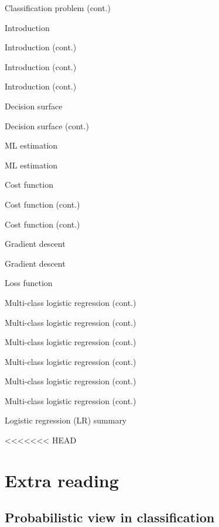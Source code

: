 \documentclass[serif, aspectratio=169]{beamer}
\begin{document}
\begin{frame}{Classification problem (cont.)}
\begin{itemize}
\begin{frame}{Introduction}
\begin{itemize}
\begin{frame}{Introduction (cont.)}
\begin{frame}{Introduction (cont.)}
\begin{frame}{Introduction (cont.)}
\begin{frame}{Decision surface}
\begin{itemize}
\begin{frame}{Decision surface (cont.)}
\begin{frame}{ML estimation}
\begin{frame}{ML estimation}
\begin{itemize}
\begin{frame}{Cost function}
\begin{frame}{Cost function (cont.)}
\begin{itemize}
\begin{itemize}
\begin{frame}{Cost function (cont.)}
\begin{frame}{Gradient descent}
\begin{frame}{Gradient descent}
\begin{frame}{Loss function}
\begin{frame}{Multi-class logistic regression (cont.)}
\begin{frame}{Multi-class logistic regression (cont.)}
\begin{frame}{Multi-class logistic regression (cont.)}
\begin{frame}{Multi-class logistic regression (cont.)}
\begin{frame}{Multi-class logistic regression (cont.)}
\begin{frame}{Multi-class logistic regression (cont.)}
\begin{frame}{Logistic regression (LR) summary}
\begin{itemize}
<<<<<<< HEAD
\section{Extra reading}
\subsection{Probabilistic view in classification}


\end{itemize}
\end{frame}
\end{frame}
\end{frame}
\end{frame}
\end{frame}
\end{frame}
\end{frame}
\end{frame}
\end{frame}
\end{frame}
\end{frame}
\end{itemize}
\end{itemize}
\end{frame}
\end{frame}
\end{itemize}
\end{frame}
\end{frame}
\end{frame}
\end{itemize}
\end{frame}
\end{frame}
\end{frame}
\end{frame}
\end{itemize}
\end{frame}
\end{itemize}
\end{frame}
\end{document}

